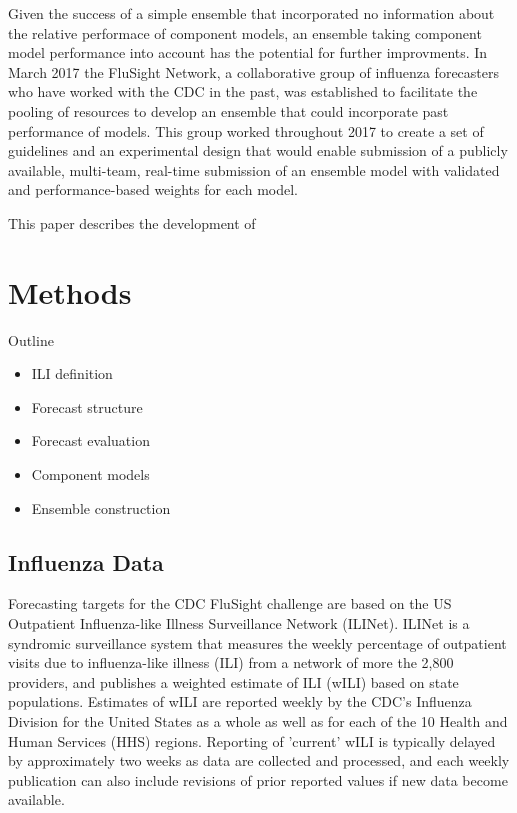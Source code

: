 \documentclass{article}
\begin{document}
Given the success of a simple ensemble that incorporated no information about the relative performace of component models, an ensemble taking component model performance into account has the potential for further improvments. In March 2017 the FluSight Network, a collaborative group of influenza forecasters who have worked with the CDC in the past, was established to facilitate the pooling of resources to develop an ensemble that could incorporate past performance of models. This group worked throughout 2017 to create a set of guidelines and an experimental design that would enable submission of a publicly available, multi-team, real-time submission of an ensemble model with validated and performance-based weights for each model. 

This paper describes the development of 




% 
% 
% 


\section{Methods}

Outline
\begin{itemize}
    \item ILI definition
    \item Forecast structure
    \item Forecast evaluation
    \item Component models
    \item Ensemble construction
\end{itemize}

\subsection{Influenza Data}
Forecasting targets for the CDC FluSight challenge are based on the US Outpatient Influenza-like Illness Surveillance Network (ILINet). ILINet is a syndromic surveillance system that measures the weekly percentage of outpatient visits due to influenza-like illness (ILI) from a network of more the 2,800 providers, and publishes a weighted estimate of ILI (wILI) based on state populations. Estimates of wILI are reported weekly by the CDC's Influenza Division for the United States as a whole as well as for each of the 10 Health and Human Services (HHS) regions. Reporting of 'current' wILI is typically delayed by approximately two weeks as data are collected and processed, and each weekly publication can also include revisions of prior reported values if new data become available.
\end{document}
